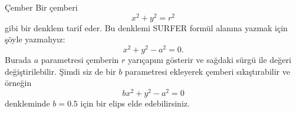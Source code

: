 \begin{surferPage}[Çember]{Çember}
Bir çemberi 
\[x^2+y^2=r^2\]
gibi bir denklem tarif eder.
Bu denklemi SURFER formül alanına yazmak için şöyle yazmalıyız:
\[x^2+y^2-a^2=0.\]
Burada  $a$ parametresi çemberin $r$ yarıçapını gösterir ve sağdaki sürgü ile değeri değiştirilebilir. 
Şimdi siz de bir $b$ parametresi ekleyerek çemberi sıkıştırabilir ve örneğin
\[bx^2+y^2-a^2=0\] 
denkleminde $b=0.5$ için bir elips elde edebilirsiniz.
\end{surferPage}
